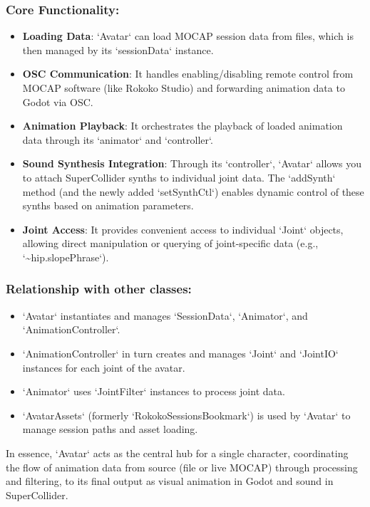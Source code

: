 \documentclass[11pt]{article}
\begin{document}
\subsubsection{\textbf{Core Functionality}:}
\label{sec:orgfb664cb}
\begin{itemize}
\item \textbf{Loading Data}: `Avatar` can load MOCAP session data from files, which is then managed by its `sessionData` instance.
\item \textbf{OSC Communication}: It handles enabling/disabling remote control from MOCAP software (like Rokoko Studio) and forwarding animation data to Godot via OSC.
\item \textbf{Animation Playback}: It orchestrates the playback of loaded animation data through its `animator` and `controller`.
\item \textbf{Sound Synthesis Integration}: Through its `controller`, `Avatar` allows you to attach SuperCollider synths to individual joint data. The `addSynth` method (and the newly added `setSynthCtl`) enables dynamic control of these synths based on animation parameters.
\item \textbf{Joint Access}: It provides convenient access to individual `Joint` objects, allowing direct manipulation or querying of joint-specific data (e.g., `\textasciitilde{}hip.slopePhrase`).
\end{itemize}
\subsubsection{\textbf{Relationship with other classes}:}
\label{sec:org53f80dd}
\begin{itemize}
\item `Avatar` instantiates and manages `SessionData`, `Animator`, and `AnimationController`.
\item `AnimationController` in turn creates and manages `Joint` and `JointIO` instances for each joint of the avatar.
\item `Animator` uses `JointFilter` instances to process joint data.
\item `AvatarAssets` (formerly `RokokoSessionsBookmark`) is used by `Avatar` to manage session paths and asset loading.
\end{itemize}

In essence, `Avatar` acts as the central hub for a single character, coordinating the flow of animation data from source (file or live MOCAP) through processing and filtering, to its final output as visual animation in Godot and sound in SuperCollider.
\end{document}
